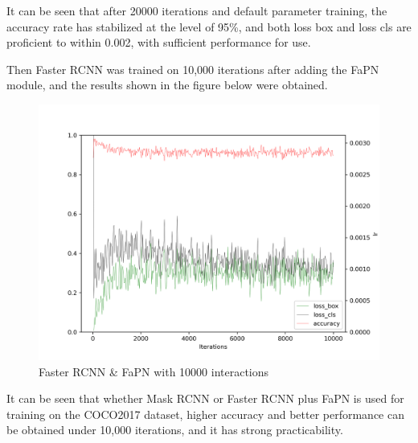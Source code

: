 
It can be seen that after 20000 iterations and default parameter training, the accuracy rate has stabilized at the level of 95\%, and both loss box and loss cls are proficient to within 0.002, with sufficient performance for use.



Then Faster RCNN \cite{ren2015faster} was trained on 10,000 iterations after adding the FaPN module, and the results shown in the figure below were obtained.

\begin{figure}[htb]
    \centering
    \includegraphics[width=1\textwidth]{figures/faster_rcnn_r_50_fapn_1x_10000iter.png}
    \caption{Faster RCNN \& FaPN with 10000 interactions}\label{faster_rcnn_r_50_fapn_1x_10000iter}
\end{figure}

It can be seen that whether Mask RCNN \cite{he2017mask} or Faster RCNN plus FaPN is used for training on the COCO2017 dataset, higher accuracy and better performance can be obtained under 10,000 iterations, and it has strong practicability.


